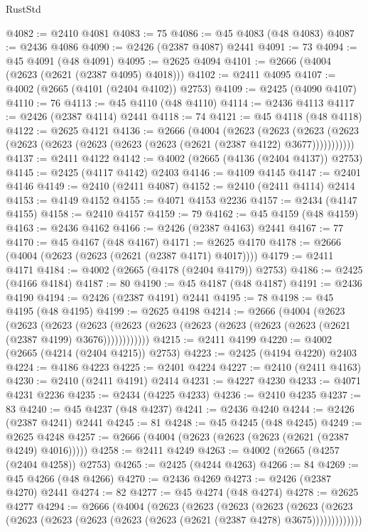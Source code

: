 \begin{lexlean}{RustStd}
\begin{coremodule}
@4082 := @2410 @4081
@4083 := 75
@4086 := @45 @4083 (@48 @4083)
@4087 := @2436 @4086
@4090 := @2426 (@2387 @4087) @2441
@4091 := 73
@4094 := @45 @4091 (@48 @4091)
@4095 := @2625 @4094
@4101 := @2666 (@4004 (@2623 (@2621 (@2387 @4095) @4018)))
@4102 := @2411 @4095
@4107 := @4002 (@2665 (@4101 (@2404 @4102)) @2753)
@4109 := @2425 (@4090 @4107)
@4110 := 76
@4113 := @45 @4110 (@48 @4110)
@4114 := @2436 @4113
@4117 := @2426 (@2387 @4114) @2441
@4118 := 74
@4121 := @45 @4118 (@48 @4118)
@4122 := @2625 @4121
@4136 := @2666
    (@4004
      (@2623
        (@2623
          (@2623 (@2623 (@2623 (@2623 (@2623 (@2623 (@2623 (@2621 (@2387 @4122) @3677)))))))))))
@4137 := @2411 @4122
@4142 := @4002 (@2665 (@4136 (@2404 @4137)) @2753)
@4145 := @2425 (@4117 @4142) @2403
@4146 := @4109 @4145
@4147 := @2401 @4146
@4149 := @2410 (@2411 @4087)
@4152 := @2410 (@2411 @4114) @2414
@4153 := @4149 @4152
@4155 := @4071 @4153 @2236
@4157 := @2434 (@4147 @4155)
@4158 := @2410 @4157
@4159 := 79
@4162 := @45 @4159 (@48 @4159)
@4163 := @2436 @4162
@4166 := @2426 (@2387 @4163) @2441
@4167 := 77
@4170 := @45 @4167 (@48 @4167)
@4171 := @2625 @4170
@4178 := @2666 (@4004 (@2623 (@2623 (@2621 (@2387 @4171) @4017))))
@4179 := @2411 @4171
@4184 := @4002 (@2665 (@4178 (@2404 @4179)) @2753)
@4186 := @2425 (@4166 @4184)
@4187 := 80
@4190 := @45 @4187 (@48 @4187)
@4191 := @2436 @4190
@4194 := @2426 (@2387 @4191) @2441
@4195 := 78
@4198 := @45 @4195 (@48 @4195)
@4199 := @2625 @4198
@4214 := @2666
    (@4004
      (@2623
        (@2623
          (@2623
            (@2623 (@2623 (@2623 (@2623 (@2623 (@2623 (@2623 (@2621 (@2387 @4199) @3676))))))))))))
@4215 := @2411 @4199
@4220 := @4002 (@2665 (@4214 (@2404 @4215)) @2753)
@4223 := @2425 (@4194 @4220) @2403
@4224 := @4186 @4223
@4225 := @2401 @4224
@4227 := @2410 (@2411 @4163)
@4230 := @2410 (@2411 @4191) @2414
@4231 := @4227 @4230
@4233 := @4071 @4231 @2236
@4235 := @2434 (@4225 @4233)
@4236 := @2410 @4235
@4237 := 83
@4240 := @45 @4237 (@48 @4237)
@4241 := @2436 @4240
@4244 := @2426 (@2387 @4241) @2441
@4245 := 81
@4248 := @45 @4245 (@48 @4245)
@4249 := @2625 @4248
@4257 := @2666 (@4004 (@2623 (@2623 (@2623 (@2621 (@2387 @4249) @4016)))))
@4258 := @2411 @4249
@4263 := @4002 (@2665 (@4257 (@2404 @4258)) @2753)
@4265 := @2425 (@4244 @4263)
@4266 := 84
@4269 := @45 @4266 (@48 @4266)
@4270 := @2436 @4269
@4273 := @2426 (@2387 @4270) @2441
@4274 := 82
@4277 := @45 @4274 (@48 @4274)
@4278 := @2625 @4277
@4294 := @2666
    (@4004
      (@2623
        (@2623
          (@2623
            (@2623
              (@2623
                (@2623 (@2623 (@2623 (@2623 (@2623 (@2623 (@2621 (@2387 @4278) @3675)))))))))))))

\end{coremodule}
\end{lexlean}
